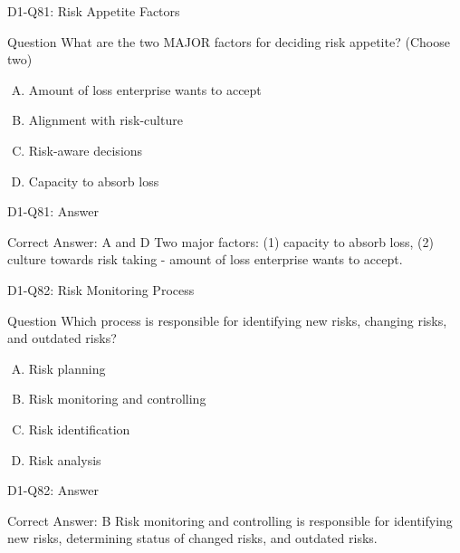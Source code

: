 \documentclass{beamer}
\begin{document}
	\begin{frame}{D1-Q81: Risk Appetite Factors}
		\begin{block}{Question}
			What are the two MAJOR factors for deciding risk appetite? (Choose two)
		\end{block}
		\begin{enumerate}[(A)]
			\item Amount of loss enterprise wants to accept
			\item Alignment with risk-culture
			\item Risk-aware decisions
			\item Capacity to absorb loss
		\end{enumerate}
	\end{frame}
	\begin{frame}{D1-Q81: Answer}
		\begin{block}{Correct Answer: A and D}
			Two major factors: (1) capacity to absorb loss, (2) culture towards risk taking - amount of loss enterprise wants to accept.
		\end{block}
	\end{frame}
	
	\begin{frame}{D1-Q82: Risk Monitoring Process}
		\begin{block}{Question}
			Which process is responsible for identifying new risks, changing risks, and outdated risks?
		\end{block}
		\begin{enumerate}[(A)]
			\item Risk planning
			\item Risk monitoring and controlling
			\item Risk identification
			\item Risk analysis
		\end{enumerate}
	\end{frame}
	\begin{frame}{D1-Q82: Answer}
		\begin{block}{Correct Answer: B}
			Risk monitoring and controlling is responsible for identifying new risks, determining status of changed risks, and outdated risks.
		\end{block}
	\end{frame}
	
\end{document}
